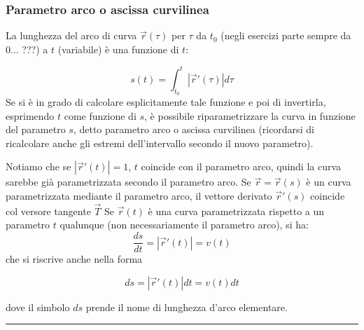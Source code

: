 \subsubsection*{Parametro arco o ascissa curvilinea}
La lunghezza del arco di curva $\vec{r}(\tau)$ per $\tau$ da $t_0$ (negli esercizi parte sempre da $0$... ???) a $t$ (variabile) è una funzione di $t$:
\begin{tcolorbox}
\[
    s(t) = \int_{t_0}^{t}|\vec{r}'(\tau)|d\tau
\]
Se si è in grado di calcolare esplicitamente tale funzione e poi di invertirla, esprimendo $t$ come funzione di $s$, è possibile riparametrizzare la curva in funzione del parametro $s$, detto parametro arco o ascissa curvilinea (ricordarsi di ricalcolare anche gli estremi dell'intervallo secondo il nuovo parametro).\newline
\end{tcolorbox}
Notiamo che se $|\vec{r}'(t)| = 1$, $t$ coincide con il parametro arco, quindi la curva sarebbe già parametrizzata secondo  il parametro arco.\newline
\newline
Se $\vec{r} = \vec{r}(s)$ è un curva parametrizzata mediante il parametro arco, il vettore derivato $\vec{r}'(s)$ coincide col versore tangente $\vec{T}$\newline
\newline
Se $\vec{r}(t)$ è una curva parametrizzata rispetto a un parametro $t$ qualunque (non necessariamente il parametro arco), si ha:
\[
    \frac{ds}{dt} =|\vec{r}'(t)| = v(t)
\]
che si riscrive anche nella forma
\begin{tcolorbox}
\[
    ds =|\vec{r}'(t)|dt =v(t) dt
\]
\end{tcolorbox} 
dove il simbolo $ds$ prende il nome di lunghezza d'arco elementare.\newline
\rule{\textwidth}{2pt}

